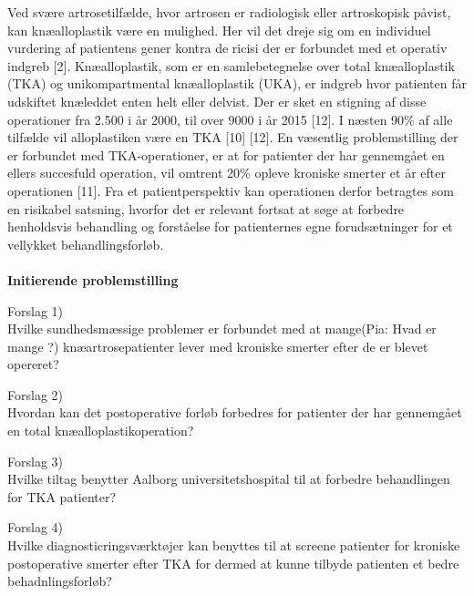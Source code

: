 Ved svære artrosetilfælde, hvor artrosen er radiologisk eller artroskopisk påvist, kan knæalloplastik være en mulighed. Her vil det dreje sig om en individuel vurdering af patientens gener kontra de ricisi der er forbundet med et operativ indgreb [2]. Knæalloplastik, som er en samlebetegnelse over total knæalloplastik (TKA) og unikompartmental knæalloplastik (UKA), er indgreb hvor patienten får udskiftet knæleddet enten helt eller delvist. Der er sket en stigning af disse operationer fra 2.500 i år 2000, til over 9000 i år 2015 [12].  I næsten 90\% af alle tilfælde vil alloplastiken være en TKA [10] [12]. En væsentlig problemstilling der er forbundet med TKA-operationer, er at for patienter der har gennemgået en ellers succesfuld operation, vil omtrent 20\% opleve kroniske smerter et år efter operationen [11]. Fra et patientperspektiv kan operationen derfor betragtes som en risikabel satsning, hvorfor det er relevant fortsat at søge at forbedre henholdsvis behandling og forståelse for patienternes egne forudsætninger for et vellykket behandlingsforløb.\\\\
\textbf{Initierende problemstilling}

Forslag 1)\\
Hvilke sundhedsmæssige problemer er forbundet med at mange(Pia: Hvad er mange ?)  knæartrosepatienter  lever med kroniske smerter efter de er blevet opereret?



Forslag 2)\\
Hvordan kan det postoperative forløb forbedres for patienter der har gennemgået en total knæalloplastikoperation?



Forslag 3)\\
Hvilke tiltag benytter Aalborg universitetshospital til at forbedre behandlingen for TKA patienter?




Forslag 4)\\
Hvilke diagnosticringsværktøjer kan benyttes til at screene patienter for  kroniske postoperative smerter efter TKA for dermed at kunne tilbyde patienten et bedre behadnlingsforløb?\\\\

